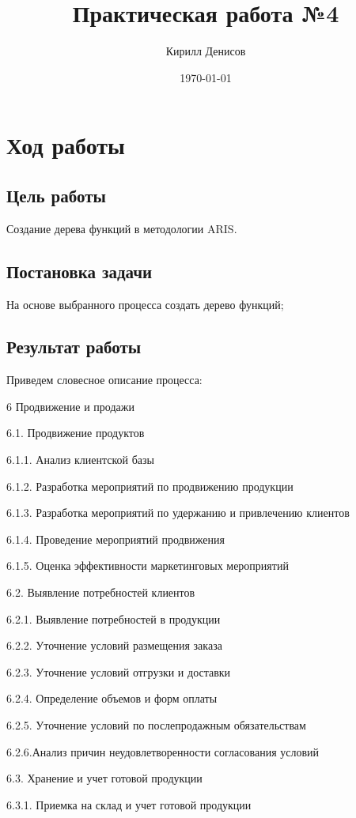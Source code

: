 \documentclass[a4paper,14pt]{extarticle}
\author{Кирилл Денисов}
\title{Практическая работа №4}
\date{\today}
\newcommand{\pathToCommonFolder}{/home/denilai/Documents/repos/latex/Common}
\begin{document}
	\thispagestyle{empty}
	
	\newpage
	\newpage
\section*{Ход работы}

\subsection*{Цель работы}
Создание дерева функций в методологии ARIS.


\subsection*{Постановка задачи}
На основе выбранного процесса создать дерево функций;

\subsection*{Результат работы}

Приведем словесное описание процесса:

6 Продвижение и продажи

6.1. Продвижение продуктов

6.1.1. Анализ клиентской базы

6.1.2. Разработка мероприятий по продвижению продукции

6.1.3. Разработка мероприятий по удержанию и привлечению клиентов

6.1.4. Проведение мероприятий продвижения

6.1.5. Оценка эффективности маркетинговых мероприятий

6.2. Выявление потребностей клиентов

6.2.1. Выявление потребностей в продукции

6.2.2. Уточнение условий размещения заказа

6.2.3. Уточнение условий отгрузки и доставки

6.2.4. Определение объемов и форм оплаты

6.2.5. Уточнение условий по послепродажным обязательствам

6.2.6.Анализ
причин
неудовлетворенности
согласования условий

6.3. Хранение и учет готовой продукции

6.3.1. Приемка на склад и учет готовой продукции
\end{document}
